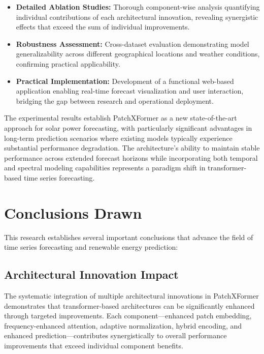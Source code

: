 \documentclass[12pt]{uomthesis}
\begin{document}
\begin{itemize}
    \item \textbf{Detailed Ablation Studies:} Thorough component-wise analysis quantifying individual contributions of each architectural innovation, revealing synergistic effects that exceed the sum of individual improvements.
    
    \item \textbf{Robustness Assessment:} Cross-dataset evaluation demonstrating model generalizability across different geographical locations and weather conditions, confirming practical applicability.
    
    \item \textbf{Practical Implementation:} Development of a functional web-based application enabling real-time forecast visualization and user interaction, bridging the gap between research and operational deployment.
\end{itemize}

The experimental results establish PatchXFormer as a new state-of-the-art approach for solar power forecasting, with particularly significant advantages in long-term prediction scenarios where existing models typically experience substantial performance degradation. The architecture's ability to maintain stable performance across extended forecast horizons while incorporating both temporal and spectral modeling capabilities represents a paradigm shift in transformer-based time series forecasting.

\section{Conclusions Drawn}

This research establishes several important conclusions that advance the field of time series forecasting and renewable energy prediction:

\subsection{Architectural Innovation Impact}

The systematic integration of multiple architectural innovations in PatchXFormer demonstrates that transformer-based architectures can be significantly enhanced through targeted improvements. Each component—enhanced patch embedding, frequency-enhanced attention, adaptive normalization, hybrid encoding, and enhanced prediction—contributes synergistically to overall performance improvements that exceed individual component benefits.
\end{document}
